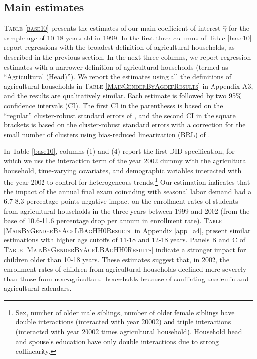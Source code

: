 \documentclass[12pt,letterpaper]{article}
\newcommand{\0}{\ensuremath{\mbox{\boldmath $0$}}}
\begin{document}
\subsection{Main estimates}

\textsc{\small Table \ref{base10}} presents the estimates of our main coefficient of interest $\hat{\gamma}$ for the sample age of 10-18 years old in 1999. In the first three columns of Table \ref{base10} report regressions with the broadest definition of agricultural households, as described in the previous section. In the next three columns, we report regression estimates with a narrower definition of agricultural households (termed as ``Agricultural (Head)''). We report the estimates using all the definitions of agricultural households in \textsc{Table \ref{MainGenderByAgdefResults}} in Appendix A3, and the results are qualitatively similar. Each estimate is followed by two 95\% confidence intervals (CI). The first CI in the parentheses is based on the ``regular'' cluster-robust standard errors of \citet{liang1986longitudinal}, and the second CI in the square brackets is based on the cluster-robust standard errors with a correction for the small number of clusters using bias-reduced linearization (BRL) of \citet{PustejovskyTipton2018}.

In Table \ref{base10}, columns (1) and (4) report the first DID specification, for which we use the interaction term of the year 2002 dummy with the agricultural household, time-varying covariates, and demographic variables interacted with the year 2002 to control for heterogeneous trends.\footnote{Sex, number of older male siblings, number of older female siblings have double interactions (interacted with year 20002) and triple interactions (interacted with year 20002 times agricultural household). Household head and spouse's education have only double interactions due to strong collinearity. }
Our estimation indicates that the impact of the annual final exam coinciding with seasonal labor demand had a 6.7-8.3 percentage points negative impact on the enrollment rates of students from agricultural households in the three years between 1999 and 2002 (from the base of  10.6-11.6 percentage drop per annum in enrollment rate). \textsc{\small Table \ref{MainByGenderByAgeLBAgHH0Results}} in Appendix \ref{app_a4}, present similar estimations with higher age cutoffs of 11-18 and 12-18 years. Panels B and C of \textsc{Table \ref{MainByGenderByAgeLBAgHH0Results}} indicate a stronger impact for children older than 10-18 years. These estimates suggest that, in 2002, the enrollment rates of children from agricultural households declined more severely than those from non-agricultural households because of conflicting academic and agricultural calendars.
\end{document}
